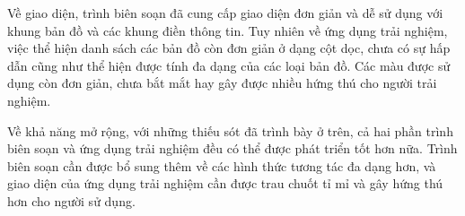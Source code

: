 Về giao diện, trình biên soạn đã cung cấp giao diện đơn giản và dễ sử dụng
với khung bản đồ và các khung điền thông tin. Tuy nhiên về ứng dụng trải nghiệm,
việc thể hiện danh sách các bản đồ còn đơn giản ở dạng cột dọc, chưa có sự hấp dẫn
cũng như thể hiện được tính đa dạng của các loại bản đồ. Các màu được sử dụng còn
đơn giản, chưa bắt mắt hay gây được nhiều hứng thú cho người trải nghiệm.

Về khả năng mở rộng, với những thiếu sót đã trình bày ở trên, cả hai phần trình
biên soạn và ứng dụng trải nghiệm đều có thể được phát triển tốt hơn nữa. Trình biên
soạn cần được bổ sung thêm về các hình thức tương tác đa dạng hơn, và giao diện
của ứng dụng trải nghiệm cần được trau chuốt tỉ mỉ và gây hứng thú hơn cho người
sử dụng.